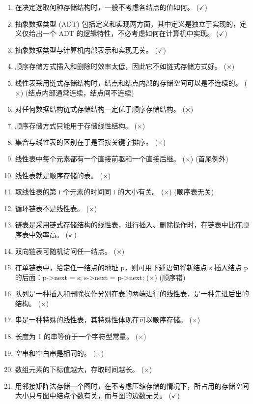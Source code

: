 \documentclass[12pt, a4paper]{article}
\begin{document}
\begin{enumerate}
    \item 在决定选取何种存储结构时，一般不考虑各结点的值如何。 (\textbf{$\checkmark$})
    \item 抽象数据类型 (ADT) 包括定义和实现两方面，其中定义是独立于实现的，定义仅给出一个 ADT 的逻辑特性，不必考虑如何在计算机中实现。 (\textbf{$\checkmark$})
    \item 抽象数据类型与计算机内部表示和实现无关。 (\textbf{$\checkmark$})
    \item 顺序存储方式插入和删除时效率太低，因此它不如链式存储方式好。 (\textbf{$\times$})
    \item 线性表采用链式存储结构时，结点和结点内部的存储空间可以是不连续的。 (\textbf{$\times$}) (结点内部通常连续，结点间不连续)
    \item 对任何数据结构链式存储结构一定优于顺序存储结构。 (\textbf{$\times$})
    \item 顺序存储方式只能用于存储线性结构。 (\textbf{$\times$})
    \item 集合与线性表的区别在于是否按关键字排序。 (\textbf{$\times$})
    \item 线性表中每个元素都有一个直接前驱和一个直接后继。 (\textbf{$\times$}) (首尾例外)
    \item 线性表就是顺序存储的表。 (\textbf{$\times$})
    \item 取线性表的第 i 个元素的时间同 i 的大小有关。 (\textbf{$\times$}) (顺序表无关)
    \item 循环链表不是线性表。 (\textbf{$\times$})
    \item 链表是采用链式存储结构的线性表，进行插入、删除操作时，在链表中比在顺序表中效率高。 (\textbf{$\checkmark$})
    \item 双向链表可随机访问任一结点。 (\textbf{$\times$})
    \item 在单链表中，给定任一结点的地址 p，则可用下述语句将新结点 s 插入结点 p 的后面：p->next = s; s->next = p->next; (\textbf{$\times$}) (顺序错)
    \item 队列是一种插入和删除操作分别在表的两端进行的线性表，是一种先进后出的结构。 (\textbf{$\times$})
    \item 串是一种特殊的线性表，其特殊性体现在可以顺序存储。 (\textbf{$\times$})
    \item 长度为 1 的串等价于一个字符型常量。 (\textbf{$\times$})
    \item 空串和空白串是相同的。 (\textbf{$\times$})
    \item 数组元素的下标值越大，存取时间越长。 (\textbf{$\times$})
    \item 用邻接矩阵法存储一个图时，在不考虑压缩存储的情况下，所占用的存储空间大小只与图中结点个数有关，而与图的边数无关。 (\textbf{$\checkmark$})

\end{enumerate}
\end{document}
